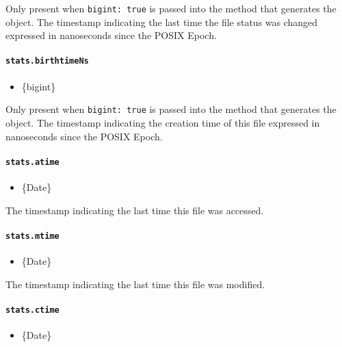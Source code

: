 Only present when \texttt{bigint:\ true} is passed into the method that
generates the object. The timestamp indicating the last time the file
status was changed expressed in nanoseconds since the POSIX Epoch.

\paragraph{\texorpdfstring{\texttt{stats.birthtimeNs}}{stats.birthtimeNs}}\label{stats.birthtimens}

\begin{itemize}
\tightlist
\item
  \{bigint\}
\end{itemize}

Only present when \texttt{bigint:\ true} is passed into the method that
generates the object. The timestamp indicating the creation time of this
file expressed in nanoseconds since the POSIX Epoch.

\paragraph{\texorpdfstring{\texttt{stats.atime}}{stats.atime}}\label{stats.atime}

\begin{itemize}
\tightlist
\item
  \{Date\}
\end{itemize}

The timestamp indicating the last time this file was accessed.

\paragraph{\texorpdfstring{\texttt{stats.mtime}}{stats.mtime}}\label{stats.mtime}

\begin{itemize}
\tightlist
\item
  \{Date\}
\end{itemize}

The timestamp indicating the last time this file was modified.

\paragraph{\texorpdfstring{\texttt{stats.ctime}}{stats.ctime}}\label{stats.ctime}

\begin{itemize}
\tightlist
\item
  \{Date\}
\end{itemize}

